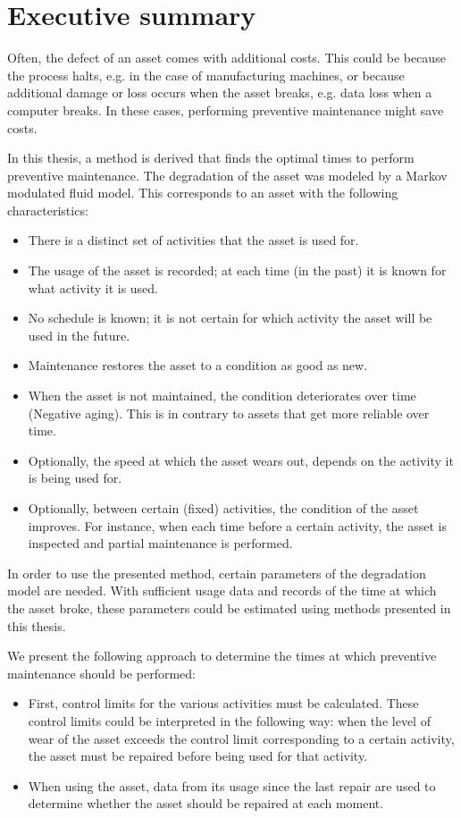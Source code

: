 \documentclass[a4paper]{thesis}
\theoremstyle{definition}
\begin{document}
\chapter*{Executive summary}
Often, the defect of an asset comes with additional costs.
This could be because the process halts, e.g. in the case of manufacturing machines, or because additional damage or loss occurs when the asset breaks, e.g. data loss when a computer breaks.
In these cases, performing preventive maintenance might save costs.

In this thesis, a method is derived that finds the optimal times to perform preventive maintenance.
The degradation of the asset was modeled by a Markov modulated fluid model.
This corresponds to an asset with the following characteristics:
\begin{itemize}
	\item There is a distinct set of activities that the asset is used for.
	\item The usage of the asset is recorded; at each time (in the past) it is known for what activity it is used.
	\item No schedule is known; it is not certain for which activity the asset will be used in the future.
	\item Maintenance restores the asset to a condition as good as new.
	\item When the asset is not maintained, the condition deteriorates over time (Negative aging).
	This is in contrary to assets that get more reliable over time.
	\item Optionally, the speed at which the asset wears out, depends on the activity it is being used for.
	\item Optionally, between certain (fixed) activities, the condition of the asset improves.
	For instance, when each time before a certain activity, the asset is inspected and partial maintenance is performed.
\end{itemize}

In order to use the presented method, certain parameters of the degradation model are needed.
With sufficient usage data and records of the time at which the asset broke, these parameters could be estimated using methods presented in this thesis.

We present the following approach to determine the times at which preventive maintenance should be performed:
\begin{itemize}
	\item First, control limits for the various activities must be calculated.
	These control limits could be interpreted in the following way:
	when the level of wear of the asset exceeds the control limit corresponding to a certain activity, the asset must be repaired before being used for that activity.
	\item When using the asset, data from its usage since the last repair are used to determine whether the asset should be repaired at each moment.
\end{itemize}
\end{document}
